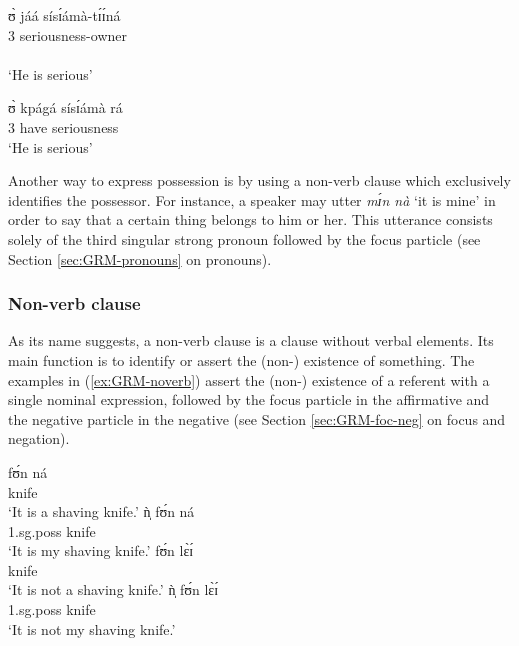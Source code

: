 \ea\label{ex:GRM-poss-owner}

 \ea\label{ex:GRM-poss-owner-exist}
\glll ʊ̀ jáá sísɪ́ámà-tɪ́ɪ́ná\\
{3\sg} {\ident} seriousness-owner\\
  {\psor} {}   {\psed} \\
\glt `He is serious'

 \ex\label{ex:GRM-poss-owner-have}
\gll ʊ̀ kpágá sísɪ́ámà rá\\
{3\sg} have {seriousness} {\foc}\\
\glt `He is serious'

\z 
 \z

Another way to express possession is by using a non-verb clause which
  exclusively identifies   the possessor. For instance, a speaker may utter 
{\it 
mɪ́n nà} `it is
mine' in order to say that a
certain thing belongs to him or her. This utterance consists solely of the third
singular strong pronoun followed by
the focus particle (see Section \ref{sec:GRM-pronouns} on pronouns).


\subsubsection{Non-verb clause}
\label{sec:GRM-noverb}

As its name suggests, a non-verb clause is a clause without verbal elements. 
Its
main function is to identify or assert the (non-) existence of 
something.  The examples in (\ref{ex:GRM-noverb}) assert the (non-) existence
of a
referent with a single nominal expression, followed by the focus particle in
the affirmative and the negative particle in the negative (see Section
\ref{sec:GRM-foc-neg} on focus and negation). 


\begin{multicols}{2}
\ea\label{ex:GRM-noverb}
 \ea\label{ex:GRM-noverb-aff-1}
\gll fʊ́n ná\\
knife {\foc}\\
\glt `It is a shaving knife.'
 \ex\label{ex:GRM-noverb-aff-poss}
\gll ǹ̩ fʊ́n ná\\
{\sc 1.sg.poss} knife {\foc}\\
 \glt `It is my shaving knife.'
 \ex\label{ex:GRM-noverb-neg-1}
\gll fʊ́n lɛ̀ɪ́\\
knife {\neg}\\
 \glt `It is not a shaving knife.'
 \ex\label{ex:GRM-noverb-neg-poss}
\gll ǹ̩  fʊ́n lɛ̀ɪ́\\
{\sc 1.sg.poss} knife {\neg}\\
 \glt `It is not my shaving knife.'

\z 
 \z
\end{multicols}

